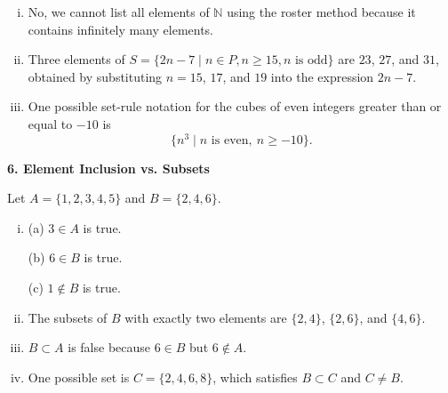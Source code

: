 \documentclass[12pt]{article}
\begin{document}
\begin{enumerate}[i.]

\item 
No, we cannot list all elements of $\mathbb{N}$ using the roster method because it contains infinitely many elements.

\item 
Three elements of 
$S = \{2n - 7 \mid n \in P, n \ge 15, n \text{ is odd}\}$ 
are $23$, $27$, and $31$, obtained by substituting $n = 15$, $17$, and $19$ into the expression $2n - 7$.

\item 
One possible set-rule notation for the cubes of even integers greater than or equal to $-10$ is
\[
\{n^3 \mid n \text{ is even},\ n \ge -10\}.
\]

\end{enumerate}

\textbf{6. Element Inclusion vs. Subsets}

Let $A = \{1,2,3,4,5\}$ and $B = \{2,4,6\}$.

\begin{enumerate}[i.]

\item 
(a) $3 \in A$ is true.  

(b) $6 \in B$ is true.  

(c) $1 \notin B$ is true.

\item 
The subsets of $B$ with exactly two elements are $\{2,4\}$, $\{2,6\}$, and $\{4,6\}$.

\item 
$B \subset A$ is false because $6 \in B$ but $6 \notin A$.

\item 
One possible set is $C = \{2,4,6,8\}$, which satisfies $B \subset C$ and $C \ne B$.

\end{enumerate}
\end{document}
